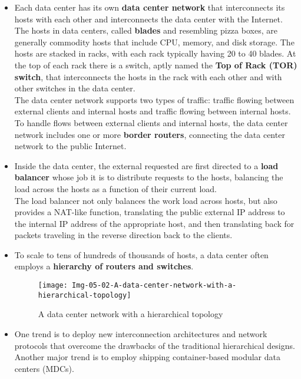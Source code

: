 \begin{itemize}
\item
Each data center has its own \textbf{data center network} that interconnects its hosts with each other and interconnects the data center with the Internet.\\
The hosts in data centers, called \textbf{blades} and resembling pizza boxes, are generally commodity hosts that include CPU, memory, and disk storage. The hosts are stacked in racks, with each rack typically having 20 to 40 blades. At the top of each rack there is a switch, aptly named the \textbf{Top of Rack (TOR) switch}, that interconnects the hosts in the rack with each other and with other switches in the data center.\\
The data center network supports two types of traffic: traffic flowing between external clients and internal hosts and traffic flowing between internal hosts. To handle flows between external clients and internal hosts, the data center network includes one or more \textbf{border routers}, connecting the data center network to the public Internet.

\item
Inside the data center, the external requested are first directed to a \textbf{load balancer} whose job it is to distribute requests to the hosts, balancing the load across the hosts as a function of their current load.\\
The load balancer not only balances the work load across hosts, but also provides a NAT-like function, translating the public external IP address to the internal IP address of the appropriate host, and then translating back for packets traveling in the reverse direction back to the clients.

\item
To scale to tens of hundreds of thousands of hosts, a data center often employs a \textbf{hierarchy of routers and switches}.

\begin{figure}[h]
\texttt{[image: Img-05-02-A-data-center-network-with-a-hierarchical-topology]}
\centering
\caption{A data center network with a hierarchical topology}
\label{fig:fig-05-02}
\end{figure}

\item
One trend is to deploy new interconnection architectures and network protocols that overcome the drawbacks of the traditional hierarchical designs.\\
Another major trend is to employ shipping container-based modular data centers (MDCs).

\end{itemize}